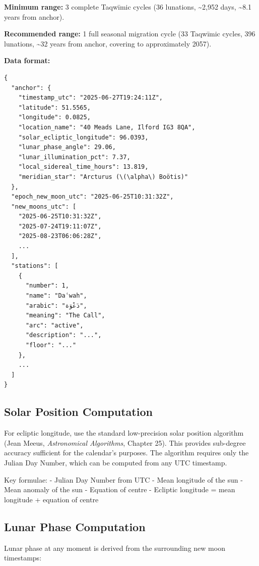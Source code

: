 \textbf{Minimum range:} 3 complete Taqwīmic cycles (36 lunations, \textasciitilde2,952 days, \textasciitilde8.1 years from anchor).

\textbf{Recommended range:} 1 full seasonal migration cycle (33 Taqwīmic cycles, 396 lunations, \textasciitilde32 years from anchor, covering to approximately 2057).

\textbf{Data format:}

\begin{lstlisting}
{
  "anchor": {
    "timestamp_utc": "2025-06-27T19:24:11Z",
    "latitude": 51.5565,
    "longitude": 0.0825,
    "location_name": "40 Meads Lane, Ilford IG3 8QA",
    "solar_ecliptic_longitude": 96.0393,
    "lunar_phase_angle": 29.06,
    "lunar_illumination_pct": 7.37,
    "local_sidereal_time_hours": 13.819,
    "meridian_star": "Arcturus (\(\alpha\) Boötis)"
  },
  "epoch_new_moon_utc": "2025-06-25T10:31:32Z",
  "new_moons_utc": [
    "2025-06-25T10:31:32Z",
    "2025-07-24T19:11:07Z",
    "2025-08-23T06:06:28Z",
    ...
  ],
  "stations": [
    {
      "number": 1,
      "name": "Daʿwah",
      "arabic": "دَعْوَة",
      "meaning": "The Call",
      "arc": "active",
      "description": "...",
      "floor": "..."
    },
    ...
  ]
}
\end{lstlisting}

\hypertarget{solar-position-computation}{%
\subsection{Solar Position Computation}\label{solar-position-computation}}

For ecliptic longitude, use the standard low-precision solar position algorithm (Jean Meeus, \emph{Astronomical Algorithms}, Chapter 25). This provides sub-degree accuracy sufficient for the calendar's purposes. The algorithm requires only the Julian Day Number, which can be computed from any UTC timestamp.

Key formulae:
- Julian Day Number from UTC
- Mean longitude of the sun
- Mean anomaly of the sun
- Equation of centre
- Ecliptic longitude = mean longitude + equation of centre

\hypertarget{lunar-phase-computation}{%
\subsection{Lunar Phase Computation}\label{lunar-phase-computation}}

Lunar phase at any moment is derived from the surrounding new moon timestamps:

